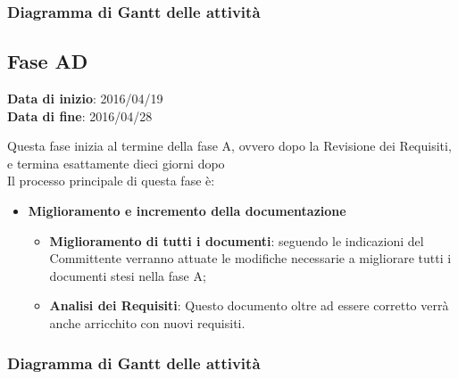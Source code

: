 		
		\subsubsection{Diagramma di Gantt delle attività}
		
		
	\subsection{Fase AD}
	\begin{center}
		\textbf{Data di inizio}: 2016/04/19 \\
		\textbf{Data di fine}: 2016/04/28 \\
	\end{center}
	Questa fase inizia al termine della fase A, ovvero dopo la Revisione dei Requisiti, e termina esattamente dieci giorni dopo \\ 
	Il processo principale di questa fase è:
	\begin{itemize}
		\item \textbf{Miglioramento e incremento della documentazione}
		\att
		\begin{itemize}
			\item \textbf{Miglioramento di tutti i documenti}: seguendo le indicazioni del Committente verranno attuate le modifiche necessarie a migliorare tutti i documenti stesi nella fase A;
			\item \textbf{Analisi dei Requisiti}: Questo documento oltre ad essere corretto verrà anche arricchito con nuovi requisiti.
		\end{itemize}
	\end{itemize}
		
		
		\subsubsection{Diagramma di Gantt delle attività}
		
		

